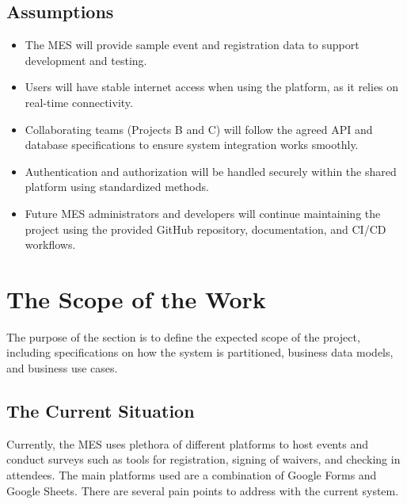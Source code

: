 \documentclass[12pt]{article}
\begin{document}
\subsection{Assumptions}

\begin{itemize}
    \item The MES will provide sample event and registration data to support development and testing.
    \item Users will have stable internet access when using the platform, as it relies on real-time connectivity.
    \item Collaborating teams (Projects B and C) will follow the agreed API and database specifications to ensure system integration works smoothly.
    \item Authentication and authorization will be handled securely within the shared platform using standardized methods.
    \item Future MES administrators and developers will continue maintaining the project using the provided GitHub repository, documentation, and CI/CD workflows.
\end{itemize}


\section{The Scope of the Work}

The purpose of the section is to define the expected scope of the project, including specifications on how the system is partitioned, business data models, and business use cases.

\subsection{The Current Situation}

Currently, the MES uses plethora of different platforms to host events and conduct surveys such as tools for registration, signing of waivers, and checking in attendees. The main platforms used are a combination of Google Forms and Google Sheets. There are several pain points to address with the current system.
\end{document}
